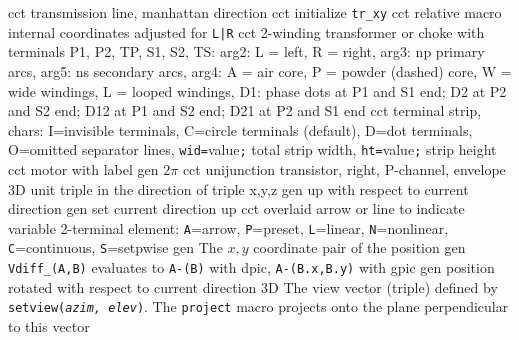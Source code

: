   {cct}
  {transmission line, manhattan direction}
  {cct}
  {initialize {\tt tr\_xy}}
  {cct}
  {relative macro internal coordinates adjusted for {\tt L|R}}
  {cct}
  {2-winding transformer or choke with terminals P1, P2, TP, S1, S2, TS:
    arg2: L = left, R = right,
    arg3: np primary arcs,
    arg5: ns secondary arcs,
    arg4: A = air core, P = powder (dashed) core,
    W = wide windings, L = looped windings,
    D1: phase dots at P1 and S1 end; D2 at P2 and S2 end; D12 at P1 and S2 end;
    D21 at P2 and S1 end 
   }
  {cct}
  {terminal strip, chars:
   I=invisible terminals,
   C=circle terminals (default),
   D=dot terminals,
   O=omitted separator lines,
   {\tt wid=}value{\tt ;} total strip width,
   {\tt ht=}value{\tt ;} strip height
    }
  {cct}
  {motor with label}
  {gen}
  {$2\pi$}
  {cct}
  {unijunction transistor, right, P-channel, envelope
    }
  {3D}
  {unit triple in the direction of triple x,y,z}
  {gen}
  {up with respect to current direction}
  {gen}
  {set current direction up }
  {cct}
  {overlaid arrow or line to indicate variable 2-terminal element:
    {\tt A}=arrow, {\tt P}=preset,
    {\tt L}=linear, {\tt N}=nonlinear, {\tt C}=continuous, {\tt S}=setpwise
   }
  {gen}
  {The $x, y$ coordinate pair of the position}
  {gen}
  {{\tt Vdiff\_(A,B)} evaluates to {\tt A-(B)} with dpic, {\tt A-(B.x,B.y)}
   with gpic}
  {gen}
  {position rotated with respect to current direction}
  {3D}
  {The view vector (triple) defined by {\tt setview({\sl azim, elev})}. The
   {\tt project}
   macro projects onto the plane perpendicular to this vector}
